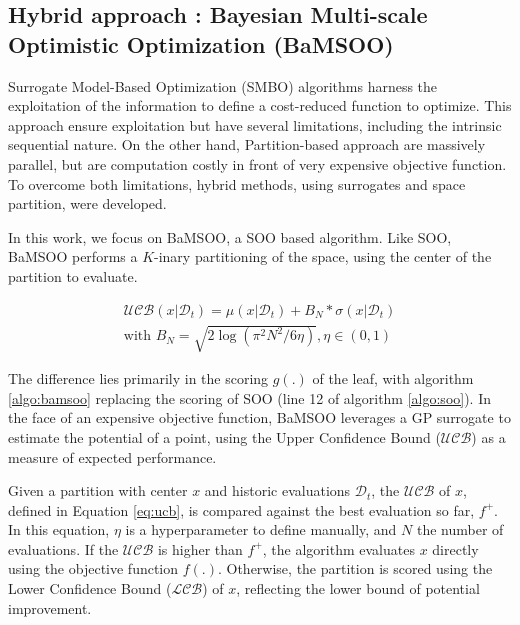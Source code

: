 \documentclass[runningheads]{llncs}
\begin{document}
\subsection{Hybrid approach : Bayesian Multi-scale Optimistic Optimization (BaMSOO)}
\label{sec:bamsoo}
Surrogate Model-Based Optimization (SMBO) algorithms harness the exploitation of the information to define a cost-reduced function to optimize. This approach ensure exploitation but have several limitations, including the intrinsic sequential nature. On the other hand, Partition-based approach are massively parallel, but are computation costly in front of very expensive objective function. To overcome both limitations, hybrid methods, using surrogates and space partition, were developed.

In this work, we focus on BaMSOO, a SOO based algorithm. Like SOO, BaMSOO performs a $K$-inary partitioning of the space, using the center of the partition to evaluate. 

\begin{equation}
    \begin{split}
    \mathcal{UCB}(x| \mathcal D_t) = \mu(x|\mathcal D_t) +  B_N * \sigma(x|\mathcal D_t) 
    \\ \text{with } B_N = \sqrt{2 \log (\pi^2 N^2/6 \eta)} , \eta \in (0,1)      
    \end{split}  
    \label{eq:ucb}
\end{equation}

The difference lies primarily in the scoring $g(.)$ of the leaf, with algorithm \ref{algo:bamsoo} replacing the scoring of SOO (line 12 of algorithm \ref{algo:soo}). In the face of an expensive objective function, BaMSOO leverages a GP surrogate to estimate the potential of a point, using the Upper Confidence Bound ($\mathcal{UCB}$) as a measure of expected performance. 

Given a partition with center $x$ and historic evaluations $\mathcal{D}_t$, the $\mathcal {UCB}$ of $x$, defined in Equation \ref{eq:ucb}, is compared against the best evaluation so far, $f^+$. In this equation, $\eta$ is a hyperparameter to define manually, and $N$ the number of evaluations. If the $\mathcal {UCB}$ is higher than $f^+$, the algorithm evaluates $x$ directly using the objective function $f(.)$. Otherwise, the partition is scored using the Lower Confidence Bound ($\mathcal{LCB}$) of $x$, reflecting the lower bound of potential improvement.
\end{document}
